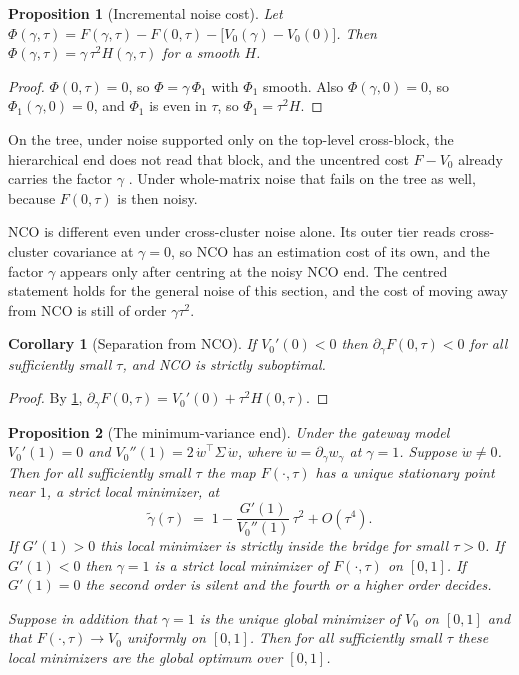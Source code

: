 \documentclass[11pt]{article}
\newtheorem{proposition}{Proposition}
\newtheorem{corollary}{Corollary}
\begin{document}
\begin{proposition}[Incremental noise cost]
\label{prop:incremental}
Let $\Phi(\gamma,\tau)=F(\gamma,\tau)-F(0,\tau)-\big[V_0(\gamma)-V_0(0)\big]$.
Then $\Phi(\gamma,\tau)=\gamma\,\tau^2H(\gamma,\tau)$ for a smooth $H$.
\end{proposition}

\begin{proof}
$\Phi(0,\tau)=0$, so $\Phi=\gamma\,\Phi_1$ with $\Phi_1$ smooth. Also
$\Phi(\gamma,0)=0$, so $\Phi_1(\gamma,0)=0$, and $\Phi_1$ is even in $\tau$,
so $\Phi_1=\tau^2H$.
\end{proof}

On the tree, under noise supported only on the top-level cross-block, the
hierarchical end does not read that block, and the uncentred cost $F-V_0$
already carries the factor $\gamma$ \cite{cotton2026bridge}. Under
whole-matrix noise that fails on the tree as well, because $F(0,\tau)$ is
then noisy.

NCO is different even under cross-cluster noise alone. Its outer tier reads
cross-cluster covariance at $\gamma=0$, so NCO has an estimation cost of its
own, and the factor $\gamma$ appears only after centring at the noisy NCO
end. The centred statement holds for the general noise of this section, and
the cost of moving away from NCO is still of order $\gamma\tau^2$.

\begin{corollary}[Separation from NCO]
\label{cor:separation}
If $V_0'(0)<0$ then $\partial_\gamma F(0,\tau)<0$ for all sufficiently small
$\tau$, and NCO is strictly suboptimal.
\end{corollary}

\begin{proof}
By \cref{prop:incremental},
$\partial_\gamma F(0,\tau)=V_0'(0)+\tau^2H(0,\tau)$.
\end{proof}

\begin{proposition}[The minimum-variance end]
\label{prop:mvend}
Under the gateway model $V_0'(1)=0$ and
$V_0''(1)=2\,\dot w^\top\Sigma\,\dot w$, where
$\dot w=\partial_\gamma w_\gamma$ at $\gamma=1$. Suppose $\dot w\neq0$. Then
for all sufficiently small $\tau$ the map $F(\cdot,\tau)$ has a unique
stationary point near $1$, a strict local minimizer, at
\begin{equation}
  \tilde\gamma(\tau)\;=\;1-\frac{G'(1)}{V_0''(1)}\,\tau^2+O(\tau^4).
  \label{eq:shift}
\end{equation}
If $G'(1)>0$ this local minimizer is strictly inside the bridge for small
$\tau>0$. If $G'(1)<0$ then $\gamma=1$ is a strict local minimizer of
$F(\cdot,\tau)$ on $[0,1]$. If $G'(1)=0$ the second order is silent and the
fourth or a higher order decides.

Suppose in addition that $\gamma=1$ is the unique global minimizer of $V_0$
on $[0,1]$ and that $F(\cdot,\tau)\to V_0$ uniformly on $[0,1]$. Then for
all sufficiently small $\tau$ these local minimizers are the global optimum
over $[0,1]$.
\end{proposition}
\end{document}
